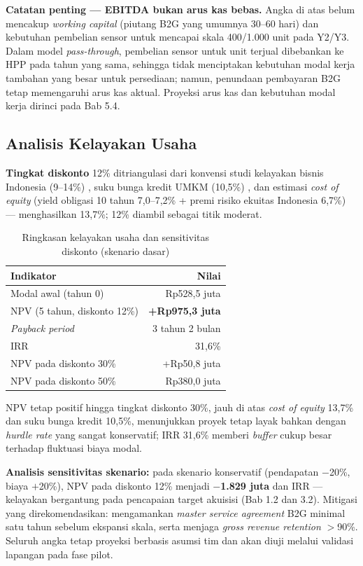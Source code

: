 \textbf{Catatan penting --- EBITDA bukan arus kas bebas.} Angka di atas belum mencakup \textit{working capital} (piutang B2G yang umumnya 30--60 hari) dan kebutuhan pembelian sensor untuk mencapai skala 400/1.000 unit pada Y2/Y3. Dalam model \textit{pass-through}, pembelian sensor untuk unit terjual dibebankan ke HPP pada tahun yang sama, sehingga tidak menciptakan kebutuhan modal kerja tambahan yang besar untuk persediaan; namun, penundaan pembayaran B2G tetap memengaruhi arus kas aktual. Proyeksi arus kas dan kebutuhan modal kerja dirinci pada Bab 5.4.

\subsection{Analisis Kelayakan Usaha}
\label{sec:5-4}

\textbf{Tingkat diskonto} 12\% ditriangulasi dari konvensi studi kelayakan bisnis Indonesia (9--14\%) \parencite{kasmirjakfar}, suku bunga kredit UMKM (\textpm{}10,5\%) \parencite{ojk2026lendingrate}, dan estimasi \textit{cost of equity} (yield obligasi 10 tahun \textpm{}7,0--7,2\% + premi risiko ekuitas Indonesia \textpm{}6,7\%) \parencite{sbn10y2026,damodaran2026} --- menghasilkan \textpm{}13,7\%; 12\% diambil sebagai titik moderat.

\begin{table}[H]
\footnotesize
\renewcommand{\arraystretch}{0.85}
\begin{tabularx}{\textwidth}{|X|r|}
\hline
\textbf{Indikator} & \textbf{Nilai} \\
\hline
Modal awal (tahun 0) & Rp528,5 juta \\
\hline
NPV (5 tahun, diskonto 12\%) & \textbf{+Rp975,3 juta} \\
\hline
\textit{Payback period} & \textpm{}3 tahun 2 bulan \\
\hline
IRR & \textpm{}31,6\% \\
\hline
NPV pada diskonto 30\% & +Rp50,8 juta \\
\hline
NPV pada diskonto 50\% & \textendash{}Rp380,0 juta \\
\hline
\end{tabularx}
\caption{Ringkasan kelayakan usaha dan sensitivitas diskonto (skenario dasar)}
\end{table}

NPV tetap positif hingga tingkat diskonto \textpm{}30\%, jauh di atas \textit{cost of equity} \textpm{}13,7\% dan suku bunga kredit \textpm{}10,5\%, menunjukkan proyek tetap layak bahkan dengan \textit{hurdle rate} yang sangat konservatif; IRR \textpm{}31,6\% memberi \textit{buffer} cukup besar terhadap fluktuasi biaya modal.

\textbf{Analisis sensitivitas skenario:} pada skenario konservatif (pendapatan $-$20\%, biaya $+$20\%), NPV pada diskonto 12\% menjadi \textpm{}\textbf{$-$1.829 juta} dan IRR  --- kelayakan bergantung pada pencapaian target akuisisi (Bab 1.2 dan 3.2). Mitigasi yang direkomendasikan: mengamankan \textit{master service agreement} B2G minimal satu tahun sebelum ekspansi skala, serta menjaga \textit{gross revenue retention} $>$90\%. Seluruh angka tetap proyeksi berbasis asumsi tim dan akan diuji melalui validasi lapangan pada fase pilot.
